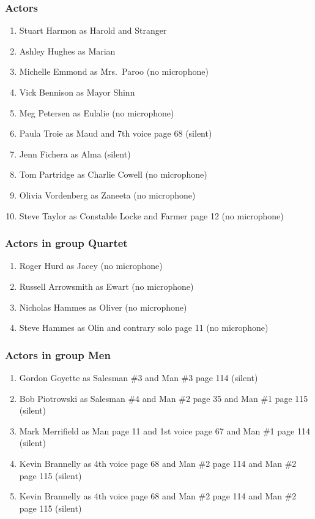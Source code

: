 \subsubsection{Actors}
\begin{enumerate}
\item Stuart Harmon as Harold and Stranger
\item Ashley Hughes as Marian
\item Michelle Emmond as Mrs.~Paroo (no microphone)
\item Vick Bennison as Mayor Shinn
\item Meg Petersen as Eulalie (no microphone)
\item Paula Troie as Maud and 7th voice page 68 (silent)
\item Jenn Fichera as Alma (silent)
\item Tom Partridge as Charlie Cowell (no microphone)
\item Olivia Vordenberg as Zaneeta (no microphone)
\item Steve Taylor as Constable Locke and Farmer page 12 (no microphone)
\end{enumerate}
\subsubsection{Actors in group Quartet}
\begin{enumerate}
\item Roger Hurd as Jacey (no microphone)
\item Russell Arrowsmith as Ewart (no microphone)
\item Nicholas Hammes as Oliver (no microphone)
\item Steve Hammes as Olin and contrary solo page 11 (no microphone)
\end{enumerate}
\subsubsection{Actors in group Men}
\begin{enumerate}
\item Gordon Goyette as Salesman \#3 and Man \#3 page 114 (silent)
\item Bob Piotrowski as Salesman \#4 and Man \#2 page 35 and Man \#1 page 115 (silent)
\item Mark Merrifield as Man page 11 and 1st voice page 67 and Man \#1 page 114 (silent)
\item Kevin Brannelly as 4th voice page 68 and Man \#2 page 114 and Man \#2 page 115 (silent)
\item Kevin Brannelly as 4th voice page 68 and Man \#2 page 114 and Man \#2 page 115 (silent)
\end{enumerate}
